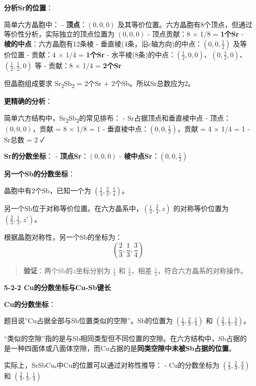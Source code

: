 \documentclass[a4paper,11pt]{ctexart}
\newcommand{\箭}{\ensuremath{\rightarrow}}
\newcommand{\左箭}{\ensuremath{\leftarrow}}
\newcommand{\上箭}{\ensuremath{\uparrow}}
\newcommand{\下箭}{\ensuremath{\downarrow}}
\newcommand{\衡}{\ensuremath{\rightleftharpoons}}
\newcommand{\双箭}{\ensuremath{\leftrightarrow}}
\newcommand{\约等于}{\ensuremath{\approx}}
\newcommand{\小于等于}{\ensuremath{\leq}}
\newcommand{\大于等于}{\ensuremath{\geq}}
\newcommand{\不等于}{\ensuremath{\neq}}
\newcommand{\西格马}{\ensuremath{\sigma}}
\newcommand{\派}{\ensuremath{\pi}}
\begin{document}
\textbf{分析Sr的位置}：

简单六方晶胞中：
- \textbf{顶点}：\((0, 0, 0)\) 及其等价位置。六方晶胞有8个顶点，但通过等价性分析，实际独立的顶点位置为 \((0, 0, 0)\)
- 顶点贡献：8 × 1/8 = \textbf{1个Sr}
- \textbf{棱的中点}：六方晶胞有12条棱
- 垂直棱(4条，沿\(c\)轴方向)的中点：\((0, 0, \frac{1}{2})\) 及等价位置
- 贡献：4 × 1/4 = \textbf{1个Sr}
- 水平棱(8条)的中点：\((\frac{1}{2}, 0, 0)\)、\((0, \frac{1}{2}, 0)\)、\((\frac{1}{2}, \frac{1}{2}, 0)\) 等
- 贡献：8 × 1/4 = \textbf{2个Sr}

但晶胞组成要求 Sr\textsubscript{2}Sb\textsubscript{2} = 2个Sr + 2个Sb。所以Sr总数应为2。

\textbf{更精确的分析}：

简单六方结构中，Sr\textsubscript{2}Sb\textsubscript{2}的常见排布：
- Sr占据顶点和垂直棱中点
- 顶点：\((0, 0, 0)\)，贡献 = 8 × 1/8 = 1
- 垂直棱中点：\((0, 0, \frac{1}{2})\)，贡献 = 4 × 1/4 = 1
- Sr总数 = 2 ✓

\textbf{Sr的分数坐标}：
- \textbf{顶点Sr}：\((0, 0, 0)\)
- \textbf{棱中点Sr}：\((0, 0, \frac{1}{2})\)

\textbf{另一个Sb的分数坐标}：

晶胞中有2个Sb，已知一个为 \((\frac{1}{3}, \frac{2}{3}, \frac{1}{4})\)。

另一个Sb位于对称等价位置。在六方晶系中，\((\frac{1}{3}, \frac{2}{3}, z)\) 的对称等价位置为 \((\frac{2}{3}, \frac{1}{3}, z')\)。

根据晶胞对称性，另一个Sb的坐标为：
\[(\frac{2}{3}, \frac{1}{3}, \frac{3}{4})\]

\begin{quote}
\textbf{验证}：两个Sb的\(z\)坐标分别为 \(\frac{1}{4}\) 和 \(\frac{3}{4}\)，相差 \(\frac{1}{2}\)，符合六方晶系的对称操作。
\end{quote}

\textbf{5-2-2 Cu的分数坐标与Cu-Sb键长}

\textbf{Cu的分数坐标}：

题目说''Cu占据全部与Sb位置类似的空隙''。Sb的位置为 \((\frac{1}{3}, \frac{2}{3}, \frac{1}{4})\) 和 \((\frac{2}{3}, \frac{1}{3}, \frac{3}{4})\)。

``类似的空隙''指的是与Sb相同类型但不同位置的空隙。在六方结构中，Sb占据的是一种四面体或八面体空隙，而Cu占据的是\textbf{同类空隙中未被Sb占据的位置}。

实际上，SrSbCuₓ中Cu的位置可以通过对称性推导：
- Cu的分数坐标为 \((\frac{1}{3}, \frac{2}{3}, \frac{3}{4})\) 和 \((\frac{2}{3}, \frac{1}{3}, \frac{1}{4})\)
\end{document}
